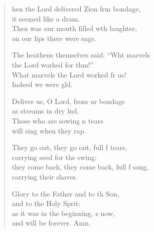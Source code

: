 \settowidth{\versewidth}{they come back, they come back, full of song, *}
\begin{verse}%
  \begin{patverse}
hen the Lord delivered Zion frm bondage,\Med\\
it seemed like a dram.\\
Then was our mouth filled w\pointup{\i}th laughter,\Med\\
on our lips there were sngs.

The heathens themselves said: “Wht marvels\Med\\
the Lord worked for thm!”\\
What marvels the Lord worked fr us!\Med\\
Indeed we were gld.

Deliver us, O Lord, from ur bondage\Med\\
as streams in dry lnd.\\
Those who are sowing \pointup{\i}n tears\Med\\
will sing when they rap.

They go out, they go out, full f tears,\Med\\
carrying seed for the swing:\\
they come back, they come back, full f song,\Med\\
carrying their shaves.

Glory to the Father and to th Son,\Med\\
and to the Holy Sprit:\\
as it was in the beginning, \pointup{\i}s now,\Med\\
and will be forever. Amn. 
  \end{patverse}
\end{verse}
